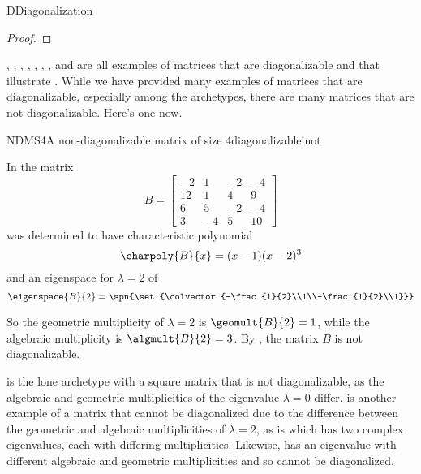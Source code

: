 \begin{subsect}{D}{Diagonalization}
\begin{proof}
%
\end{proof}
%
\begin{para},
,
,
,
,
,
,
 and
are all examples of matrices that are diagonalizable and that illustrate .  While we have provided many examples of matrices that are diagonalizable, especially among the archetypes, there are many matrices that are not diagonalizable.  Here's one now.\end{para}
%
\begin{example}{NDMS4}{A non-diagonalizable matrix of size 4}{diagonalizable!not}
\begin{para}In  the matrix
%
\begin{equation*}
B=
\begin{bmatrix}
-2 & 1 & -2 & -4\\
12 & 1 & 4 & 9\\
6 & 5 & -2 & -4\\
3 & -4 & 5 & 10
\end{bmatrix}
\end{equation*}
%
was determined to have characteristic polynomial
%
\begin{equation*}
\charpoly{B}{x}=(x-1)(x-2)^3
\end{equation*}
%
and an eigenspace for $\lambda=2$ of
%
\begin{equation*}
\eigenspace{B}{2}=\spn{\set{\colvector{-\frac{1}{2}\\1\\-\frac{1}{2}\\1}}}\\
\end{equation*}
\end{para}
%
\begin{para}So the geometric multiplicity of $\lambda=2$ is $\geomult{B}{2}=1$, while the algebraic multiplicity is $\algmult{B}{2}=3$.  By , the matrix $B$ is not diagonalizable.\end{para}
%
\end{example}
%
\begin{para} is the lone archetype with a square matrix that is not diagonalizable, as the algebraic and geometric multiplicities of the eigenvalue $\lambda=0$ differ.   is another example of a matrix that cannot be diagonalized due to the difference between the geometric and algebraic multiplicities of $\lambda=2$, as is  which has two complex eigenvalues, each with differing multiplicities.  Likewise,  has an eigenvalue with different algebraic and geometric multiplicities and so cannot be diagonalized.\end{para}

\end{subsect}
